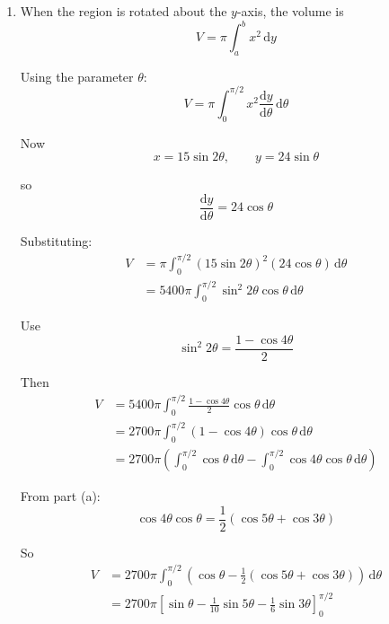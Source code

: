 \documentclass[leqno]{article}
\begin{document}
\begin{enumerate}[
  label=\textbf{\arabic*.},
  leftmargin=*,
  topsep=0pt,
  partopsep=0pt,
  parsep=0pt
]
\begin{djsSolution}
\begin{enumerate}[label=\textbf{(\alph*)}]
and
\[
\cos 3\theta=\cos(4\theta-\theta)=\cos 4\theta\cos\theta+\sin 4\theta\sin\theta
\]

Adding these gives
\begin{align*}
\cos 5\theta+\cos 3\theta
&=(\cos 4\theta\cos\theta-\sin 4\theta\sin\theta)
+(\cos 4\theta\cos\theta+\sin 4\theta\sin\theta)\\
&=2\cos 4\theta\cos\theta
\end{align*}

Therefore
\[
\cos 4\theta\cos\theta \equiv \frac12(\cos 5\theta+\cos 3\theta)
\]

So the required identity is proved.

  \item When the region is rotated about the $y$-axis, the volume is
\[
V=\pi\int_a^b x^2\,\mathrm{d}y
\]

Using the parameter $\theta$:
\[
V=\pi\int_0^{\pi/2}x^2\frac{\mathrm{d}y}{\mathrm{d}\theta}\,\mathrm{d}\theta
\]

Now
\[
x=15\sin 2\theta,\qquad y=24\sin\theta
\]

so
\[
\frac{\mathrm{d}y}{\mathrm{d}\theta}=24\cos\theta
\]

Substituting:
\begin{align*}
V&=\pi\int_0^{\pi/2}(15\sin 2\theta)^2(24\cos\theta)\,\mathrm{d}\theta\\
&=5400\pi\int_0^{\pi/2}\sin^2 2\theta\cos\theta\,\mathrm{d}\theta
\end{align*}

Use
\[
\sin^2 2\theta=\frac{1-\cos 4\theta}{2}
\]

Then
\begin{align*}
V&=5400\pi\int_0^{\pi/2}\frac{1-\cos 4\theta}{2}\cos\theta\,\mathrm{d}\theta\\
&=2700\pi\int_0^{\pi/2}(1-\cos 4\theta)\cos\theta\,\mathrm{d}\theta\\
&=2700\pi\left(\int_0^{\pi/2}\cos\theta\,\mathrm{d}\theta-\int_0^{\pi/2}\cos 4\theta\cos\theta\,\mathrm{d}\theta\right)
\end{align*}

From part (a):
\[
\cos 4\theta\cos\theta=\frac12(\cos 5\theta+\cos 3\theta)
\]

So
\begin{align*}
V&=2700\pi\int_0^{\pi/2}\left(\cos\theta-\frac12(\cos 5\theta+\cos 3\theta)\right)\,\mathrm{d}\theta\\
&=2700\pi\left[\sin\theta-\frac{1}{10}\sin 5\theta-\frac{1}{6}\sin 3\theta\right]_0^{\pi/2}
\end{align*}


\end{enumerate}
\end{djsSolution}
\end{enumerate}
\end{document}
